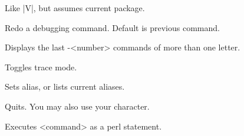 \begin{enum}{2.5cm}
Like |V|, but assumes current package.

\Xi{|!| [ [-]<number> ]}
Redo a debugging command. Default is previous command.

Displays the last -<number> commands of more than one letter.

Toggles trace mode.

Sets alias, or lists current aliases.

Quits. You may also use your  character.

Executes <command> as a perl statement.

\end{enum}

\newpage

\bigskip
{}



